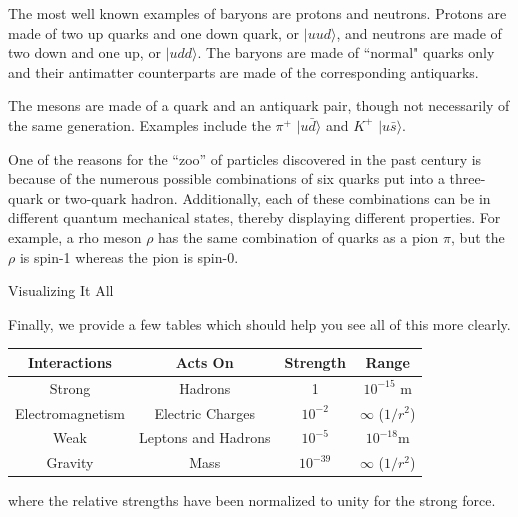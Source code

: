 \documentclass[12pt,epsf]{article}
\makeatletter
\def\subsection{\@startsection{subsection}{2}{\z@}{2.3ex plus .2ex}
 {2.3ex plus .2ex}{\bf}}
\makeatother
\begin{document}
The most well known examples of baryons are protons and neutrons. 
Protons are made of two up quarks and one down quark, or $|uud\rangle$, and
neutrons are made of two down and one up, or $|udd\rangle$.  The
baryons are made of ``normal" quarks only and their antimatter
counterparts are made of the corresponding antiquarks.

The mesons are made of a quark and an antiquark pair, though not
necessarily of the same generation.  Examples include the $\pi^+$ $|u\bar
d\rangle$ and $K^+$ $|u\bar s\rangle$. 

One of the reasons for the “zoo” of particles discovered in the past
century is because of the numerous possible combinations of six quarks
put into a three-quark or two-quark hadron. Additionally, each of these
combinations can be in different quantum mechanical states, thereby
displaying different properties.  For example, a rho meson $\rho$ has the
same combination of quarks as a pion $\pi$, but the $\rho$ is spin-1
whereas the pion is spin-0. 

\subsection{Visualizing It All}

Finally, we provide a few tables which should help you see all of this
more clearly. 
\newline
\begin{table} [h]
\centering
\begin{tabular}{|c|c|c|c|}
\hline
\bf Interactions & \bf Acts On & \bf Strength & \bf Range \rm \\
\hline
\hline
Strong & Hadrons & 1 & $10^{-15}$ m \\
\hline
Electromagnetism & Electric Charges  & $10^{-2}$ & $\infty$ ($1/r^2$)
\\
\hline
Weak & Leptons and Hadrons & $10^{-5}$ & $10^{-18}$m \\
\hline
Gravity & Mass & $10^{-39}$ & $\infty$ ($1/r^2$) \\
\hline
\end{tabular} \label{firsttab}
\end{table}
\newline
where the relative strengths have been normalized to unity for the
strong force. 
\end{document}

